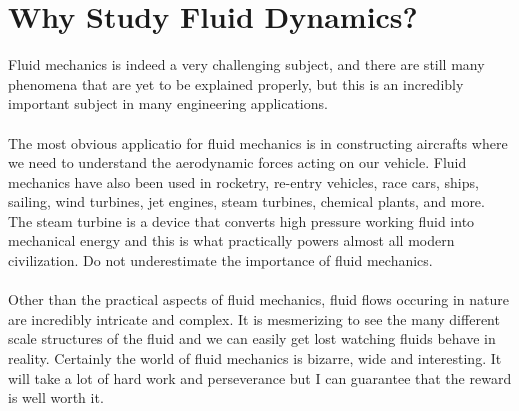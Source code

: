 \chapter{Why Study Fluid Dynamics?}


Fluid mechanics is indeed a very challenging subject, and there are still many phenomena that are yet to be explained properly, but this is an incredibly important subject in many engineering applications.
\\~\\The most obvious applicatio for fluid mechanics is in constructing aircrafts where we need to understand the aerodynamic forces acting on our vehicle.
Fluid mechanics have also been used in rocketry, re-entry vehicles, race cars, ships, sailing, wind turbines, jet engines, steam turbines, chemical plants, and more.
The steam turbine is a device that converts high pressure working fluid into mechanical energy and this is what practically powers almost all modern civilization. 
Do not underestimate the importance of fluid mechanics.
\\~\\Other than the practical aspects of fluid mechanics, fluid flows occuring in nature are incredibly intricate and complex. 
It is mesmerizing to see the many different scale structures of the fluid and we can easily get lost watching fluids behave in reality.
Certainly the world of fluid mechanics is bizarre, wide and interesting.
It will take a lot of hard work and perseverance but I can guarantee that the reward is well worth it.

